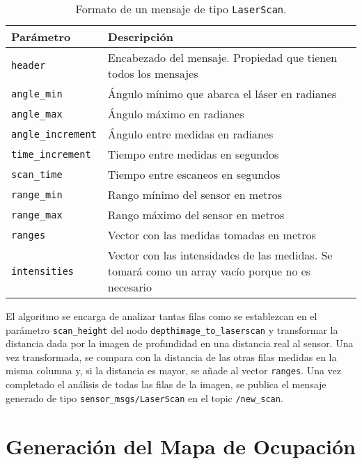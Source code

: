 \begin{table}[h]
\begin{center}
\begin{tabular}{| w{c}{4cm} | m{6.5cm} |}
	\hline
	Parámetro & Descripción \\ \hline
	\texttt{header} & Encabezado del mensaje. Propiedad que tienen todos los mensajes \\ \hline
	\texttt{angle\_min} & Ángulo mínimo que abarca el láser en radianes \\ \hline
	\texttt{angle\_max} & Ángulo máximo en radianes \\ \hline
	\texttt{angle\_increment} & Ángulo entre medidas en radianes \\ \hline
	\texttt{time\_increment} & Tiempo entre medidas en segundos \\ \hline
	\texttt{scan\_time} & Tiempo entre escaneos en segundos \\ \hline
	\texttt{range\_min} & Rango mínimo del sensor en metros \\ \hline
	\texttt{range\_max} & Rango máximo del sensor en metros \\ \hline
	\texttt{ranges} & Vector con las medidas tomadas en metros \\ \hline
	\texttt{intensities} & Vector con las intensidades de las medidas. Se tomará como un array vacío porque no es necesario \\ \hline
\end{tabular}
\caption{Formato de un mensaje de tipo \texttt{LaserScan}.}
\label{tab:laserscan_msg}
\end{center}
\end{table} 

El algoritmo se encarga de analizar tantas filas como se establezcan en el parámetro \texttt{scan\_height} del nodo \texttt{depthimage\_to\_laserscan} y transformar la distancia dada por la imagen de profundidad en una distancia real al sensor. Una vez transformada, se compara con la distancia de las otras filas medidas en la misma columna y, si la distancia es mayor, se añade al vector \texttt{ranges}. Una vez completado el análisis de todas las filas de la imagen, se publica el mensaje generado de tipo \texttt{sensor\_msgs/LaserScan} en el topic \texttt{/new\_scan}.\\

\section{Generación del Mapa de Ocupación} \label{mapa_ocup}

